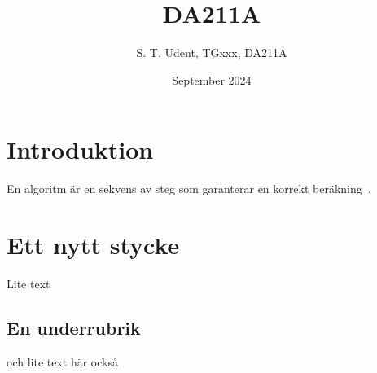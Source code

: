 \documentclass[12pt,twoside,a4paper]{article} %
\title{DA211A}
\author{S. T. Udent, TGxxx, DA211A}
\date{September 2024} %
\begin{document}

\maketitle %




\section{Introduktion}
En algoritm är en sekvens av steg som garanterar en korrekt beräkning~\cite{kernighan2021}. %

\section{Ett nytt stycke}
Lite text
\subsection{En underrubrik}
och lite text här också



\end{document}
